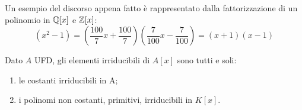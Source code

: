 \documentclass[11pt]{scrartcl}
\begin{document}
\begin{example}
    Un esempio del discorso appena fatto è rappresentato dalla fattorizzazione di un polinomio in $\mathbb Q[x]$ e $\mathbb Z[x]$:
    \[ (x^2 - 1) = \left(\frac{100}{7}x+\frac{100}{7}\right)\left(\frac{7}{100}x - \frac{7}{100}\right) = (x + 1)(x - 1)
        \]
\end{example}

\begin{theorem}
    Dato $A$ UFD, gli elementi irriducibili di $A[x]$ sono tutti e soli:
    \begin{enumerate}[(1)]
        \item le costanti irriducibili in A;
        \item i polinomi non costanti, primitivi, irriducibili in $K[x]$.
    \end{enumerate}
\end{theorem}
\end{document}
